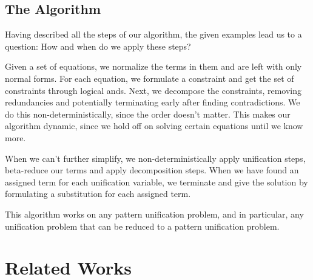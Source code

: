 \documentclass[twoside,12pt,a4paper]{article}
\begin{document}
\iffalse
\begin{align*}
        \constraints &=& &\vdash \excopatmatch{\ap{x}\Rightarrow\alphaunifvar}\equiv id 
        &\wedge& &\vdash \betaunifvar.\ap{x}\equiv \alphaunifvar\\
        &\xmapsto{(\ref{7})}_d& &x \vdash \alphaunifvar \equiv id.\ap{x}
        &\wedge& &\vdash \betaunifvar.\ap{x}\equiv \alphaunifvar\\
        &\xmapsto{(\ref{unif2})}_u& &x \vdash \alphaunifvar \equiv id.\ap{x}
        &\wedge& &\vdash \betaunifvar.\ap{x}\equiv id.\ap{x}\\
        &\xmapsto{(\ref{4})}_d& &x \vdash \alphaunifvar \equiv id.\ap{x} 
        &\wedge& &\vdash \betaunifvar \equiv id \wedge \vdash x \equiv x\\
        &\xmapsto{(\ref{1})}_r& &x \vdash \alphaunifvar \equiv id.\ap{x}
        &\wedge& &\vdash \betaunifvar \equiv id
    \end{align*}
\fi

\subsection{The Algorithm}
Having described all the steps of our algorithm, the given examples lead us to a question:
How and when do we apply these steps?

Given a set of equations, we normalize the terms in them and are left with only normal forms. 
For each equation, we formulate a constraint and get the set of constraints through logical ands.
Next, we decompose the constraints, removing redundancies and potentially terminating early after finding contradictions.
We do this non-deterministically, since the order doesn't matter. %
This makes our algorithm dynamic, since we hold off on solving certain equations until we know more.

When we can't further simplify, we non-deterministically apply unification steps, beta-reduce our terms and apply decomposition steps.
When we have found an assigned term for each unification variable, we terminate and give the solution
by formulating a substitution for each assigned term.

This algorithm works on any pattern unification problem, and in particular, any unification problem that can be reduced to a pattern unification problem. %

\section{Related Works}\label{sec:Related works}
\end{document}
